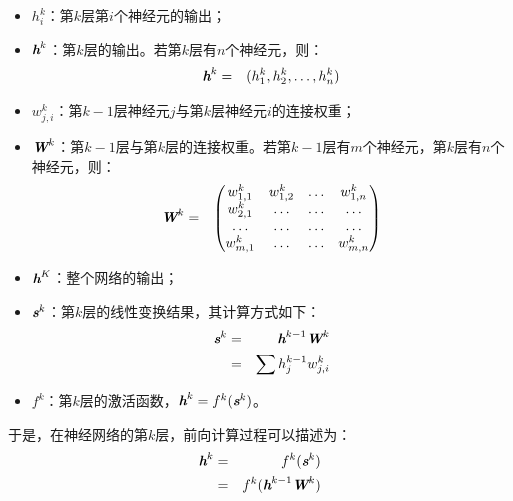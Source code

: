 \begin{itemize}
\vspace{0.5em}
\item  $ h_i^k $：第$ k $层第$ i $个神经元的输出；
\vspace{0.5em}
\item  $ {\textbf{\em h}}^k $：第$ k $层的输出。若第$ k $层有$ n $个神经元，则：
       \begin{eqnarray}
       {\textbf{\em h}}^k&=&(h_1^k,h_2^k,\dots,h_n^k)
       \end{eqnarray}
\vspace{0.5em}
\item  $ w_{j,i}^k $：第$ k-1 $层神经元$ j $与第$ k $层神经元$ i $的连接权重；
\vspace{0.5em}
\item  $ {\textbf{\em W}}^k $：第$ k-1 $层与第$ k $层的连接权重。若第$ k-1 $层有$ m $个神经元，第$ k $层有$ n $个神经元，则：
       \begin{eqnarray}
       {\textbf{\em W}}^k &=& \begin{pmatrix} w_{1,1}^k & w_{1,2}^k & \dots & w_{1,n}^k\\w_{2,1}^k & \dots & \dots & \dots\\ \dots & \dots & \dots & \dots\\w_{m,1}^k & \dots & \dots & w_{m,n}^k\end{pmatrix}
       \end{eqnarray}
\vspace{0.5em}
\item  $ {\textbf{\em h}}^K $：整个网络的输出；
\vspace{0.5em}
\item  $ {\textbf{\em s}}^k $：第$ k $层的线性变换结果，其计算方式如下：
       \begin{eqnarray}
       {\textbf{\em s}}^k & = & {\textbf{\em h}}^{k-1}{\textbf{\em W}}^k \nonumber \\
                   & = & \sum{h_j^{k-1}w_{j,i}^k}
       \label{eq:9-109}
       \end{eqnarray}
\vspace{0.5em}
\item  $ f^k $：第$ k $层的激活函数，$ {\textbf{\em h}}^k=f^k({\textbf{\em s}}^k)$。
\vspace{0.5em}
\end{itemize}

\parinterval  于是，在神经网络的第$ k $层，前向计算过程可以描述为：
\begin{eqnarray}
{\textbf{\em h}}^k & = & f^k({\textbf{\em s}}^k) \nonumber \nonumber \\
            & = & f^k({\textbf{\em h}}^{k-1}{\textbf{\em W}}^k)
\label{eq:9-46}
\end{eqnarray}

